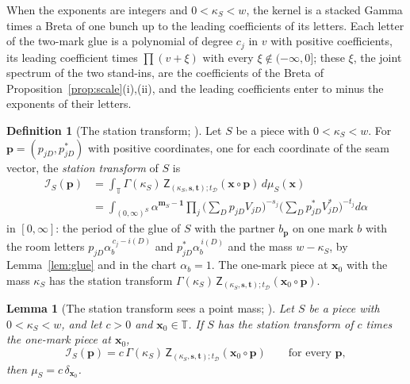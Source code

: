 \documentclass[11pt]{article}
\theoremstyle{plain}
\newtheorem{lemma}[prop]{Lemma}
\theoremstyle{definition}
\newtheorem{defn}[prop]{Definition}
\theoremstyle{remark}
\newcommand{\cD}{\mathcal D}
\newcommand{\cI}{\mathcal I}
\newcommand{\TT}{\mathbb T}
\newcommand{\bm}{\mathbf m}
\newcommand{\bx}{\mathbf x}
\newcommand{\sZ}{\mathsf Z}
\begin{document}
When the exponents are integers and $0<\kappa_S<w$, the kernel is a stacked Gamma times a Breta of one bunch up to the leading coefficients of its letters. Each letter of the two-mark glue is a polynomial of degree $c_j$ in $v$ with positive coefficients, its leading coefficient times $\prod(v+\xi)$ with every $\xi\notin(-\infty,0]$; these $\xi$, the joint spectrum of the two stand-ins, are the coefficients of the Breta of Proposition~\ref{prop:scale}(i),(ii), and the leading coefficients enter to minus the exponents of their letters.

\begin{defn}[The station transform; {\cite[Def.~27.20, p.~236]{F}}]\label{def:transform}
Let $S$ be a piece with $0<\kappa_S<w$. For $\mathbf p=(p_{jD},p^\ast_{jD})$ with positive coordinates, one for each coordinate of the seam vector, the \emph{station transform} of $S$ is
\begin{align*}
\cI_S(\mathbf p)&=\int_{\TT}\Gamma(\kappa_S)\,\sZ_{(\kappa_S,\mathbf s,\mathbf t);t_{\cD}}(\bx\circ\mathbf p)\,d\mu_S(\bx)\\
&=\int_{(0,\infty)^S}\alpha^{\bm_S-\mathbf 1}\prod_j\Big(\sum_Dp_{jD}V_{jD}\Big)^{-s_j}\Big(\sum_Dp^\ast_{jD}V^\ast_{jD}\Big)^{-t_j}d\alpha
\end{align*}
in $[0,\infty]$: the period of the glue of $S$ with the partner $b_{\mathbf p}$ on one mark $b$ with the room letters $p_{jD}\alpha_b^{\,c_j-i(D)}$ and $p^\ast_{jD}\alpha_b^{\,i(D)}$ and the mass $w-\kappa_S$, by Lemma~\ref{lem:glue} and in the chart $\alpha_b=1$. The one-mark piece at $\bx_0$ with the mass $\kappa_S$ has the station transform $\Gamma(\kappa_S)\,\sZ_{(\kappa_S,\mathbf s,\mathbf t);t_{\cD}}(\bx_0\circ\mathbf p)$.
\end{defn}

\begin{lemma}[The station transform sees a point mass; {\cite[Thm.~27.18, p.~235]{F}}]\label{lem:probe}
Let $S$ be a piece with $0<\kappa_S<w$, and let $c>0$ and $\bx_0\in\TT$. If $S$ has the station transform of $c$ times the one-mark piece at $\bx_0$,
\[
\cI_S(\mathbf p)=c\,\Gamma(\kappa_S)\,\sZ_{(\kappa_S,\mathbf s,\mathbf t);t_{\cD}}(\bx_0\circ\mathbf p)\qquad\text{for every }\mathbf p,
\]
then $\mu_S=c\,\delta_{\bx_0}$.
\end{lemma}
\end{document}
